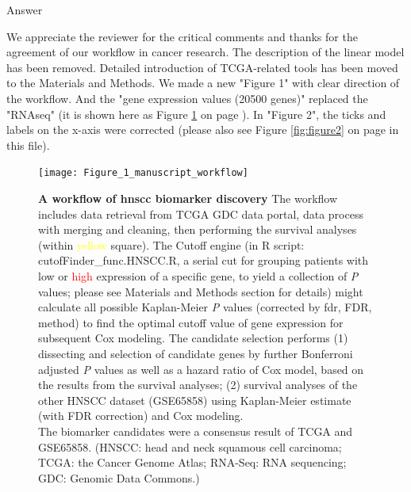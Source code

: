 \documentclass[preprint,12pt]{elsarticle}
\newcommand{\bcaption}[2]{\caption{\textbf{#1} #2}}
\newenvironment{MyColorPar}[1]{%
    \leavevmode\color{#1}\ignorespaces%
}{%
}%
\begin{document}
%
\begin{MyColorPar}{blue}
Answer

We appreciate the reviewer for the critical comments and thanks for the agreement of our workflow in cancer research.
The description of the linear model has been removed. 
Detailed introduction of TCGA-related tools has been moved to the Materials and Methods.
We made a new "Figure 1" with clear direction of the workflow.
And the "gene expression values (20500 genes)" replaced the "RNAseq" (it is shown here as Figure \ref{fig:figure1} on page \pageref{page21}).
In "Figure 2", the ticks and labels on the x-axis were corrected (please also see Figure \ref{fig:figure2} on page \pageref{page22} in this file).\\[0.5cm]


\begin{figure}[hbt!]
\centering
\texttt{[image: Figure\_1\_manuscript\_workflow]} %
\bcaption{A workflow of \acrshort{hnscc} biomarker discovery}
{The workflow includes data retrieval from TCGA GDC data portal, data process with merging and cleaning, then performing the survival analyses (within \textcolor{yellow}{yellow} square). The Cutoff engine (in R script: cutofFinder\_func.HNSCC.R, a serial cut for grouping patients with \textcolor{asparagus}{low} or \textcolor{red}{high} expression of a specific gene, to yield a collection of \textit{P} values; please see Materials and Methods section for details) might calculate all possible Kaplan-Meier \textit{P} values (corrected by \acrlong{fdr}, FDR, method) to find the optimal cutoff value of gene expression for subsequent Cox modeling.
The candidate selection performs (1) dissecting and selection of candidate genes by further Bonferroni adjusted \textit{P} values as well as a hazard ratio of Cox model, based on the results from the survival analyses;
(2) survival analyses of the other HNSCC dataset (GSE65858) using Kaplan-Meier estimate (with FDR correction) and Cox modeling.\\
The biomarker candidates were a consensus result of TCGA and GSE65858. 
(HNSCC: head and neck squamous cell carcinoma; TCGA: the Cancer Genome Atlas; RNA-Seq: RNA sequencing; GDC: Genomic Data Commons.)}
\label{fig:figure1}


\end{figure}
\end{MyColorPar}
\end{document}
